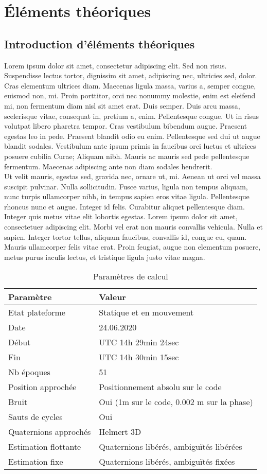 \chapter{Éléments théoriques}

\section{Introduction d'éléments théoriques}
Lorem ipsum dolor sit amet, consectetur adipiscing elit. Sed non risus. Suspendisse lectus tortor, dignissim sit amet, adipiscing nec, ultricies sed, dolor. Cras elementum ultrices diam. Maecenas ligula massa, varius a, semper congue, euismod non, mi. Proin porttitor, orci nec nonummy molestie, enim est eleifend mi, non fermentum diam nisl sit amet erat. Duis semper. Duis arcu massa, scelerisque vitae, consequat in, pretium a, enim. Pellentesque congue. Ut in risus volutpat libero pharetra tempor. Cras vestibulum bibendum augue. Praesent egestas leo in pede. Praesent blandit odio eu enim. Pellentesque sed dui ut augue blandit sodales. Vestibulum ante ipsum primis in faucibus orci luctus et ultrices posuere cubilia Curae; Aliquam nibh. Mauris ac mauris sed pede pellentesque fermentum. Maecenas adipiscing ante non diam sodales hendrerit.\\
Ut velit mauris, egestas sed, gravida nec, ornare ut, mi. Aenean ut orci vel massa suscipit pulvinar. Nulla sollicitudin. Fusce varius, ligula non tempus aliquam, nunc turpis ullamcorper nibh, in tempus sapien eros vitae ligula. Pellentesque rhoncus nunc et augue. Integer id felis. Curabitur aliquet pellentesque diam. Integer quis metus vitae elit lobortis egestas. Lorem ipsum dolor sit amet, consectetuer adipiscing elit. Morbi vel erat non mauris convallis vehicula. Nulla et sapien. Integer tortor tellus, aliquam faucibus, convallis id, congue eu, quam. Mauris ullamcorper felis vitae erat. Proin feugiat, augue non elementum posuere, metus purus iaculis lectus, et tristique ligula justo vitae magna.

\begin{center}
    \begin{longtable}{ll}
        \caption{Paramètres de calcul}\label{tab:Paramètres calcul tangent bruit saut}    \\
        \toprule
        Paramètre             & Valeur \tabularnewline
        \midrule
        \endhead
        Etat plateforme       & Statique et en mouvement\tabularnewline
        Date                  & 24.06.2020 \tabularnewline
        Début                 & UTC 14h 29min 24sec \tabularnewline
        Fin                   & UTC 14h 30min 15sec \tabularnewline
        Nb époques            & 51\tabularnewline
        Position approchée    & Positionnement absolu sur le code \tabularnewline
        Bruit                 & Oui (1m sur le code, 0.002 m sur la phase)\tabularnewline
        Sauts de cycles       & Oui \tabularnewline
        Quaternions approchés & Helmert 3D  \tabularnewline
        Estimation flottante  & Quaternions libérés, ambiguïtés libérées \tabularnewline
        Estimation fixe       & Quaternions libérés, ambiguïtés fixées \tabularnewline
        \bottomrule
    \end{longtable}
\end{center}

